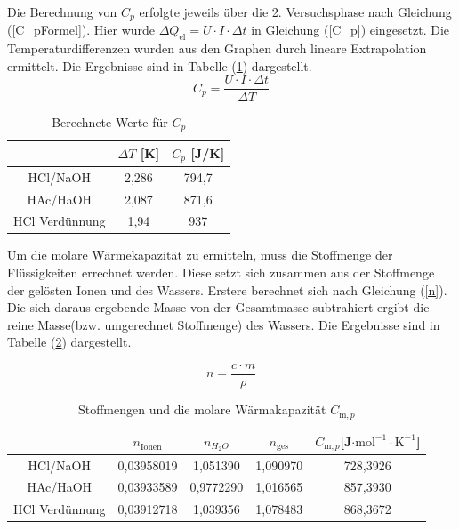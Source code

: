 \documentclass[12pt,a4paper,titlepage,headinclude,bibtotoc]{scrartcl}
\begin{document}
Die Berechnung von $C_p$ erfolgte jeweils über die 2. Versuchsphase nach Gleichung (\ref{C_pFormel}). Hier wurde $\Delta Q_{\mathrm{el}}= U\cdot I \cdot \Delta t$ in Gleichung (\ref{C_p}) eingesetzt. Die Temperaturdifferenzen wurden aus den Graphen durch lineare Extrapolation ermittelt. Die Ergebnisse sind in Tabelle (\ref{C_pTabelle}) dargestellt.\\

\begin{equation} \label{C_pFormel}
C_p=\frac{U\cdot I\cdot \Delta t}{\Delta T}
\end{equation}

\FloatBarrier
\begin{table} \caption{Berechnete Werte für $C_p$}
\label{C_pTabelle} 
\begin{tabular}{c|c|c} 
&$\Delta T$ [K] &$C_p$ [J/K]\\
\hline
HCl/NaOH&2,286&794,7\\
\hline	
HAc/HaOH&2,087&871,6\\
\hline
HCl Verdünnung&1,94&937\\
\end{tabular} 
\end{table}

 
Um die molare Wärmekapazität zu ermitteln, muss die Stoffmenge der Flüssigkeiten errechnet werden. Diese setzt sich zusammen aus der Stoffmenge der gelösten Ionen und des Wassers. Erstere berechnet sich nach Gleichung (\ref{n}). Die sich daraus ergebende Masse von der Gesamtmasse subtrahiert ergibt die reine Masse(bzw. umgerechnet Stoffmenge) des Wassers. Die Ergebnisse sind in Tabelle (\ref{StoffmengenTabelle}) dargestellt.
 
\begin{equation}\label{n}
n=\frac{c \cdot m}{\rho}
\end{equation}

\begin{table} \caption{Stoffmengen und die molare Wärmakapazität $C_{\mathrm{m},p}$}
\label{StoffmengenTabelle} 
\begin{tabular}{c|c|c|c|c}
&$n_\mathrm{Ionen}$& $n_{H_2O}$&$n_\mathrm{ges}$&$C_{\mathrm{m},p}$[J$\cdot \mathrm{mol}^{-1}\cdot \mathrm{K}^{-1}$]\\
\hline
HCl/NaOH&0,03958019&1,051390&1,090970&728,3926\\
\hline	
HAc/HaOH&0,03933589&0,9772290&1,016565&857,3930\\
\hline
HCl Verdünnung&0,03912718&1,039356&1,078483&868,3672\\
\end{tabular} 
\end{table}
\FloatBarrier
\end{document}
